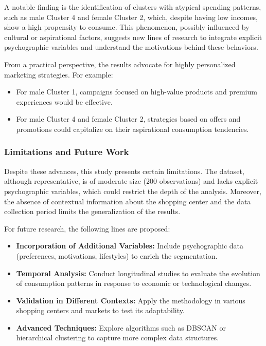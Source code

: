 \documentclass[10pt]{article}
\begin{document}
A notable finding is the identification of clusters with atypical spending patterns, such as male Cluster 4 and female Cluster 2, which, despite having low incomes, show a high propensity to consume. This phenomenon, possibly influenced by cultural or aspirational factors, suggests new lines of research to integrate explicit psychographic variables and understand the motivations behind these behaviors.

From a practical perspective, the results advocate for highly personalized marketing strategies. For example:
\begin{itemize}
    \item For male Cluster 1, campaigns focused on high-value products and premium experiences would be effective.
    \item For male Cluster 4 and female Cluster 2, strategies based on offers and promotions could capitalize on their aspirational consumption tendencies.
\end{itemize}

\subsubsection*{Limitations and Future Work}

Despite these advances, this study presents certain limitations. The dataset, although representative, is of moderate size (200 observations) and lacks explicit psychographic variables, which could restrict the depth of the analysis. Moreover, the absence of contextual information about the shopping center and the data collection period limits the generalization of the results.

For future research, the following lines are proposed:
\begin{itemize}
    \item \textbf{Incorporation of Additional Variables:} Include psychographic data (preferences, motivations, lifestyles) to enrich the segmentation.
    \item \textbf{Temporal Analysis:} Conduct longitudinal studies to evaluate the evolution of consumption patterns in response to economic or technological changes.
    \item \textbf{Validation in Different Contexts:} Apply the methodology in various shopping centers and markets to test its adaptability.
    \item \textbf{Advanced Techniques:} Explore algorithms such as DBSCAN or hierarchical clustering to capture more complex data structures.
\end{itemize}
\end{document}
